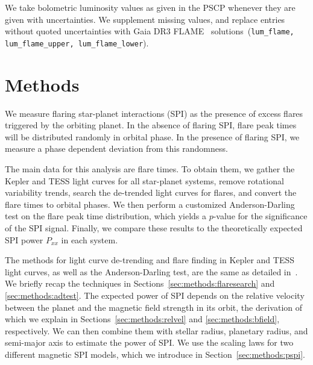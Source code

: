 \documentclass[twocolumn]{aastex631}
\begin{document}
We take bolometric luminosity values as given in the PSCP whenever they are given with uncertainties. We supplement missing values, and replace entries without quoted uncertainties with Gaia DR3 FLAME~\citep{fouesneau2022gaia} solutions~(\texttt{lum\_flame, lum\_flame\_upper, lum\_flame\_lower}). 

\section{Methods}
\label{sec:methods}
We measure flaring star-planet interactions (SPI) as the presence of excess flares triggered by the orbiting planet. In the absence of flaring SPI, flare peak times will be distributed randomly in orbital phase. In the presence of flaring SPI, we measure a phase dependent deviation from this randomness.

The main data for this analysis are flare times. To obtain them, we gather the Kepler and TESS light curves for all star-planet systems, remove rotational variability trends, search the de-trended light curves for flares, and convert the flare times to orbital phases. We then perform a customized Anderson-Darling test on the flare peak time distribution, which yields a $p$-value for the significance of the SPI signal. Finally, we compare these results to the theoretically expected SPI power $P_{xx}$ in each system.

The methods for light curve de-trending and flare finding in Kepler and TESS light curves, as well as the Anderson-Darling test, are the same as detailed in~\citet{ilin2022searching}. We briefly recap the techniques in Sections~\ref{sec:methods:flaresearch} and \ref{sec:methods:adtest}. The expected power of SPI depends on the relative velocity between the planet and the magnetic field strength in its orbit, the derivation of which we explain in 
Sections~\ref{sec:methods:relvel} and \ref{sec:methods:bfield}, respectively. We can then combine them with stellar radius, planetary radius, and semi-major axis to estimate the power of SPI. We use the scaling laws for two different magnetic SPI models, which we introduce in Section~\ref{sec:methods:pspi}.
\end{document}
